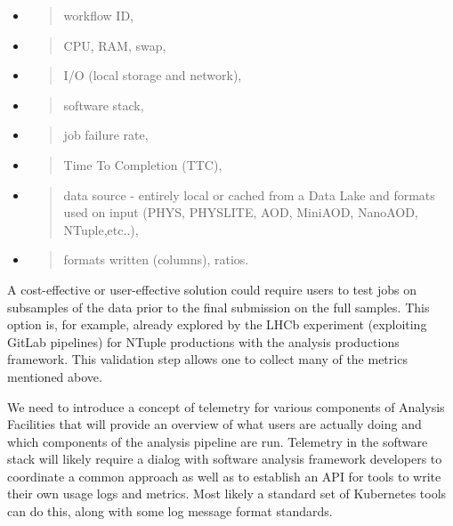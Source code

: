 \documentclass[a4paper,11pt]{article}
\begin{document}
\begin{itemize}
\item
  \begin{quote}
  workflow ID,
  \end{quote}
\item
  \begin{quote}
  CPU, RAM, swap,
  \end{quote}
\item
  \begin{quote}
  I/O (local storage and network),
  \end{quote}
\item
  \begin{quote}
  software stack,
  \end{quote}
\item
  \begin{quote}
  job failure rate,
  \end{quote}
\item
  \begin{quote}
  Time To Completion (TTC),
  \end{quote}
\item
  \begin{quote}
  data source - entirely local or cached from a Data Lake and formats
  used on input (PHYS, PHYSLITE, AOD, MiniAOD, NanoAOD, NTuple,etc..),
  \end{quote}
\item
  \begin{quote}
  formats written (columns), ratios.
  \end{quote}
\end{itemize}

A cost-effective or user-effective solution could require users to test
jobs on subsamples of the data prior to the final submission on the full
samples. This option is, for example, already explored by the LHCb
experiment (exploiting GitLab pipelines) for NTuple productions with the
analysis productions framework. This validation step allows one to
collect many of the metrics mentioned above.

We need to introduce a concept of telemetry for various components of
Analysis Facilities that will provide an overview of what users are
actually doing and which components of the analysis pipeline are run.
Telemetry in the software stack will likely require a dialog with
software analysis framework developers to coordinate a common approach
as well as to establish an API for tools to write their own usage logs
and metrics. Most likely a standard set of Kubernetes tools can do this,
along with some log message format standards.
\end{document}
